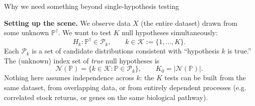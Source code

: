 \documentclass[aspectratio=169,10pt]{beamer}
\newcommand{\Kc}{\mathcal{K}}
\newcommand{\Nc}{\mathcal{N}}
\begin{document}
\begin{frame}[allowframebreaks]{Why we need something beyond single-hypothesis testing}
\framebreak

\textbf{Setting up the scene.} We observe data $X$ (the entire dataset) drawn from some unknown $\mathbb{P}^\dagger$. We want to test $K$ null hypotheses simultaneously:
\[
H_k : \mathbb{P}^\dagger \in \mathcal{P}_k, \qquad k \in \Kc := \{1,\dots,K\}.
\]
Each $\mathcal{P}_k$ is a set of candidate distributions consistent with ``hypothesis $k$ is true.'' The (unknown) index set of \emph{true} null hypotheses is
\[
\Nc(\mathbb{P}) = \{k \in \Kc : \mathbb{P} \in \mathcal{P}_k\}, \qquad K_0 = |\Nc(\mathbb{P})|.
\]
Nothing here assumes independence across $k$: the $K$ tests can be built from the same dataset, from overlapping data, or from entirely dependent processes (e.g. correlated stock returns, or genes on the same biological pathway).

\end{frame}
\end{document}
